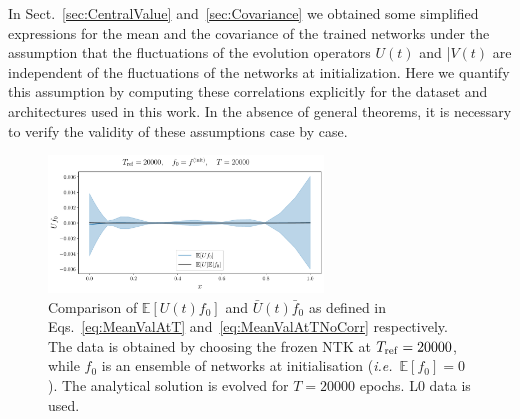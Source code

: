 


In Sect.~\ref{sec:CentralValue} and~\ref{sec:Covariance} we obtained some simplified expressions 
for the mean and the covariance of the trained networks under the assumption that the fluctuations
of the evolution operators $U(t)$ and |$V(t)$ are independent of the fluctuations of the networks 
at initialization. Here we quantify this assumption by computing these correlations explicitly 
for the dataset and architectures used in this work. In the absence of general theorems, it is necessary 
to verify the validity of these assumptions case by case. 

\begin{figure}[t!]
  \label{fig:xT3_exp_val}
  \centering
  \includegraphics[width=0.65\textwidth]{plots/u_v_studies/u_f0_independence_20000_L0.pdf}
  \caption{Comparison of $\mathbb{E}\left[U(t) f_{0}\right]$ and $\bar{U}(t) \bar{f}_{0}$ as defined in 
    Eqs.~\eqref{eq:MeanValAtT} and~\eqref{eq:MeanValAtTNoCorr} respectively. 
    The data is obtained by choosing the frozen NTK at $T_{\rm
    ref} = 20000$, while $f_0$ is an ensemble of networks at initialisation
    (\textit{i.e.}\ $\mathbb{E}[f_0]=0$). The analytical solution is evolved for
    $T=20000$ epochs. L0 data is used.}
\end{figure}
